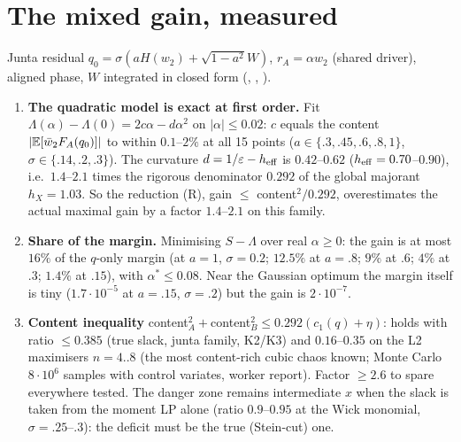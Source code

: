 \documentclass[11pt,a4paper]{article}
\begin{document}
\section{The mixed gain, measured}\label{sec:gain}
Junta residual $q_0=\sigma(aH(w_2)+\sqrt{1-a^2}W)$, $r_A=\alpha w_2$ (shared driver), aligned phase, $W$ integrated in closed form (, , ).
\begin{enumerate}
\item \textbf{The quadratic model is exact at first order.} Fit $\Lambda(\alpha)-\Lambda(0)=2c\alpha-d\alpha^2$ on $|\alpha|\le0.02$: $c$ equals the content $|\mathbb{E}[\bar w_2F_A(q_0)]|$ to within
$0.1$--$2\%$ at all 15 points ($a\in\{.3,.45,.6,.8,1\}$, $\sigma\in\{.14,.2,.3\}$). The curvature $d=1/\varepsilon-h_{\rm eff}$ is $0.42$--$0.62$ ($h_{\rm eff}=0.70$--$0.90$), i.e.\ $1.4$--$2.1$ times the
rigorous denominator $0.292$ of the global majorant $h_X=1.03$. So the reduction (R), gain $\le$ content$^2/0.292$, overestimates the actual maximal gain by a factor $1.4$--$2.1$ on this family.
\item \textbf{Share of the margin.} Minimising $S-\Lambda$ over real $\alpha\ge0$: the gain is at most $16\%$ of the $q$-only margin (at $a=1$, $\sigma=0.2$; $12.5\%$ at $a=.8$; $9\%$ at $.6$;
$4\%$ at $.3$; $1.4\%$ at $.15$), with $\alpha^*\le0.08$. Near the Gaussian optimum the margin itself is tiny ($1.7\cdot10^{-5}$ at $a=.15$, $\sigma=.2$) but the gain is $2\cdot10^{-7}$.
\item \textbf{Content inequality} content$_A^2+$content$_B^2\le0.292(c_1(q)+\eta)$: holds with ratio $\le0.385$ (true slack, junta family, K2/K3) and $0.16$--$0.35$ on the L2 maximisers
$n=4..8$ (the most content-rich cubic chaos known; Monte Carlo $8\cdot10^6$ samples with control variates, worker report). Factor $\ge2.6$ to spare everywhere tested. The danger
zone remains intermediate $x$ when the slack is taken from the moment LP alone (ratio $0.9$--$0.95$ at the Wick monomial, $\sigma=.25$--$.3$): the deficit must be the true (Stein-cut) one.
\end{enumerate}
\end{document}
